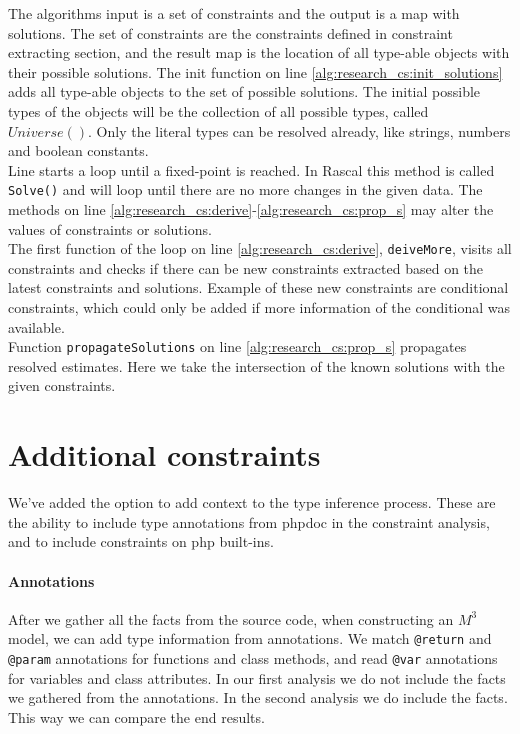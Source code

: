 \documentclass[../main.tex]{subfiles}
\begin{document}
    
    The algorithms input is a set of constraints and the output is a map with solutions.
    The set of constraints are the constraints defined in constraint extracting section, and the result map is the location of all type-able objects with their possible solutions.
    The init function on line \ref{alg:research_cs:init_solutions} adds all type-able objects to the set of possible solutions.
    The initial possible types of the objects will be the collection of all possible types, called $Universe()$.
    Only the literal types can be resolved already, like strings, numbers and boolean constants.
    \\
    Line \label{alg:research_cs:loop_start} starts a loop until a fixed-point is reached. 
    In Rascal this method is called \texttt{Solve()} and will loop until there are no more changes in the given data.
    The methods on line \ref{alg:research_cs:derive}-\ref{alg:research_cs:prop_s} may alter the values of constraints or solutions.
    \\
    The first function of the loop on line \ref{alg:research_cs:derive}, \texttt{deiveMore}, visits all constraints and checks if there can be new constraints extracted based on the latest constraints and solutions.
    Example of these new constraints are conditional constraints, which could only be added if more information of the conditional was available.
    \\
    Function \texttt{propagateSolutions} on line \ref{alg:research_cs:prop_s} propagates resolved estimates. 
    Here we take the intersection of the known solutions with the given constraints.
        
        
    \section{Additional constraints}\label{sec:implementation_additional_contraints}
    We've added the option to add context to the type inference process.
    These are the ability to include type annotations from phpdoc in the constraint analysis, and to include constraints on php built-ins.
    
    \paragraph{Annotations}
    After we gather all the facts from the source code, when constructing an $M^3$ model, we can add type information from annotations.
    We match \texttt{@return} and \texttt{@param} annotations for functions and class methods, and read \texttt{@var} annotations for variables and class attributes.
    In our first analysis we do not include the facts we gathered from the annotations. 
    In the second analysis we do include the facts.
    This way we can compare the end results.
    
\end{document}
